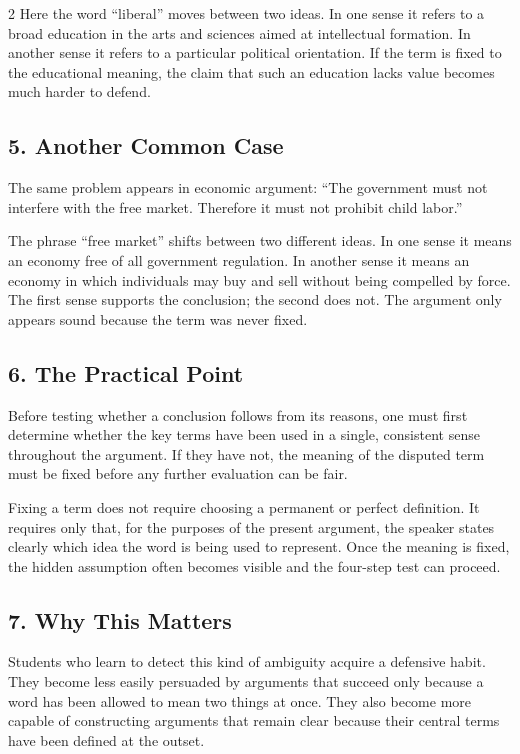 \documentclass[12pt]{article}
\begin{document}
\begin{multicols}{2}
Here the word “liberal” moves between two ideas. In one sense it refers to a broad education in the arts and sciences aimed at intellectual formation. In another sense it refers to a particular political orientation. If the term is fixed to the educational meaning, the claim that such an education lacks value becomes much harder to defend.

\subsection*{5. Another Common Case}
The same problem appears in economic argument: “The government must not interfere with the free market. Therefore it must not prohibit child labor.”

The phrase “free market” shifts between two different ideas. In one sense it means an economy free of all government regulation. In another sense it means an economy in which individuals may buy and sell without being compelled by force. The first sense supports the conclusion; the second does not. The argument only appears sound because the term was never fixed.

\subsection*{6. The Practical Point}
Before testing whether a conclusion follows from its reasons, one must first determine whether the key terms have been used in a single, consistent sense throughout the argument. If they have not, the meaning of the disputed term must be fixed before any further evaluation can be fair.

Fixing a term does not require choosing a permanent or perfect definition. It requires only that, for the purposes of the present argument, the speaker states clearly which idea the word is being used to represent. Once the meaning is fixed, the hidden assumption often becomes visible and the four-step test can proceed.

\subsection*{7. Why This Matters}
Students who learn to detect this kind of ambiguity acquire a defensive habit. They become less easily persuaded by arguments that succeed only because a word has been allowed to mean two things at once. They also become more capable of constructing arguments that remain clear because their central terms have been defined at the outset.


\end{multicols}
\end{document}
